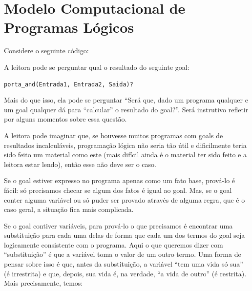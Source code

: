 \documentclass{article}
\begin{document}
\section{Modelo Computacional de Programas Lógicos}

Considere o seguinte código:


\label{lst:circuit}

A leitora pode se perguntar qual o resultado do seguinte goal:

{\tt porta\_and(Entrada1, Entrada2, Saida)?}

 Mais do que isso, ela pode se perguntar ``Será que, dado um programa qualquer e um goal qualquer dá para ``calcular'' o resultado
 do goal?''. Será instrutivo refletir por alguns momentos sobre essa questão.


A leitora pode imaginar que, se houvesse muitos programas com goals de resultados incalculáveis, programação lógica não seria tão útil e dificilmente teria sido feito um material como este (mais difícil ainda é o material ter sido feito e a leitora estar lendo), então esse não deve ser o caso.

Se o goal estiver expresso no programa apenas como um fato base, prová-lo é fácil: só precisamos checar se algum dos fatos é igual ao goal. Mas, se o goal conter alguma variável ou só puder ser provado através de alguma regra, que é o caso geral, a situação fica mais complicada.

Se o goal contiver variáveis, para prová-lo o que precisamos é encontrar uma substituição para cada uma delas de forma
que cada um dos termos do goal seja logicamente consistente com o programa. Aqui o que queremos dizer com ``substituição'' é que a
variável toma o valor de um outro termo. Uma forma de pensar sobre isso é que, antes da substituição, a variável ``tem uma vida só
sua'' (é irrestrita) e que, depois, sua vida é, na verdade, ``a vida de
outro'' (é restrita). Mais precisamente, temos:\\

\end{document}
